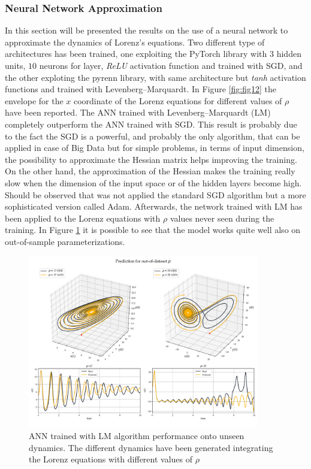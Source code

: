\documentclass[]{article}
\begin{document}
\subsubsection{Neural Network Approximation}
In this section will be presented the results on the use of a neural network to approximate the dynamics of Lorenz's equations. Two different type of architectures has been trained, one exploiting the PyTorch library with $3$ hidden units, $10$ neurons for layer, \textit{ReLU} activation function and trained with SGD, and the other exploting the pyrenn library, with same architecture but \textit{tanh} activation functions and trained with Levenberg–Marquardt. In Figure \ref{fig:fig12} the envelope for the $x$ coordinate of the Lorenz equations for different values of $\rho$ have been reported. 
The ANN trained with Levenberg–Marquardt (LM) completely outperform the ANN trained with SGD. This result is probably due to the fact the SGD is a powerful, and probably the only algorithm, that can be applied in case of Big Data but for simple problems, in terms of input dimension, the possibility to approximate the Hessian matrix helps improving the training. On the other hand, the approximation of the Hessian makes the training really slow when the dimension of the input space or of the hidden layers become high. Should be observed that was not applied the standard SGD algorithm but a more sophisticated version called Adam. Afterwards, the network trained with LM has been applied to the Lorenz equations with $\rho$ values never seen during the training. In Figure \ref{fig:fig13} it is possible to see that the model works quite well also on out-of-sample parameterizations.
\begin{figure}[!b]
	\centering
	\includegraphics[width=0.9\textwidth]{../figures/rho_oos.pdf}
	\caption{ANN trained with LM algorithm performance onto unseen dynamics. The different dynamics have been generated integrating the Lorenz equations with different values of $\rho$}
	\label{fig:fig13}
\end{figure}
\end{document}
